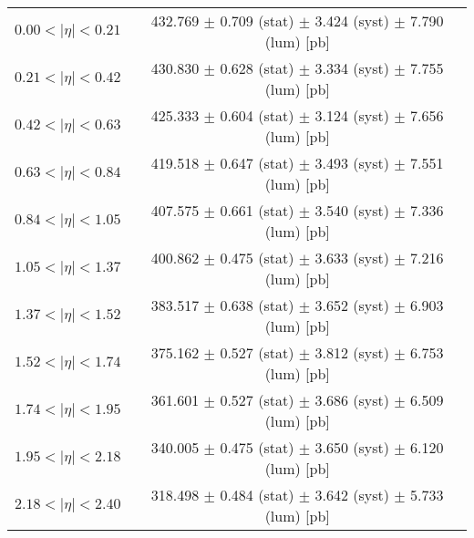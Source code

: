 \begin{tabular}{lc}
\hline
$0.00 < |\eta| <0.21$          & 432.769 $\pm$ 0.709 (stat) $\pm$ 3.424 (syst) $\pm$ 7.790 (lum) [pb]  \\
$0.21 < |\eta| <0.42$          & 430.830 $\pm$ 0.628 (stat) $\pm$ 3.334 (syst) $\pm$ 7.755 (lum) [pb]  \\
$0.42 < |\eta| <0.63$          & 425.333 $\pm$ 0.604 (stat) $\pm$ 3.124 (syst) $\pm$ 7.656 (lum) [pb]  \\
$0.63 < |\eta| <0.84$          & 419.518 $\pm$ 0.647 (stat) $\pm$ 3.493 (syst) $\pm$ 7.551 (lum) [pb]  \\
$0.84 < |\eta| <1.05$          & 407.575 $\pm$ 0.661 (stat) $\pm$ 3.540 (syst) $\pm$ 7.336 (lum) [pb]  \\
$1.05 < |\eta| <1.37$          & 400.862 $\pm$ 0.475 (stat) $\pm$ 3.633 (syst) $\pm$ 7.216 (lum) [pb]  \\
$1.37 < |\eta| <1.52$          & 383.517 $\pm$ 0.638 (stat) $\pm$ 3.652 (syst) $\pm$ 6.903 (lum) [pb]  \\
$1.52 < |\eta| <1.74$          & 375.162 $\pm$ 0.527 (stat) $\pm$ 3.812 (syst) $\pm$ 6.753 (lum) [pb]  \\
$1.74 < |\eta| <1.95$          & 361.601 $\pm$ 0.527 (stat) $\pm$ 3.686 (syst) $\pm$ 6.509 (lum) [pb]  \\
$1.95 < |\eta| <2.18$          & 340.005 $\pm$ 0.475 (stat) $\pm$ 3.650 (syst) $\pm$ 6.120 (lum) [pb]  \\
$2.18 < |\eta| <2.40$          & 318.498 $\pm$ 0.484 (stat) $\pm$ 3.642 (syst) $\pm$ 5.733 (lum) [pb]  \\
\hline
\end{tabular}
